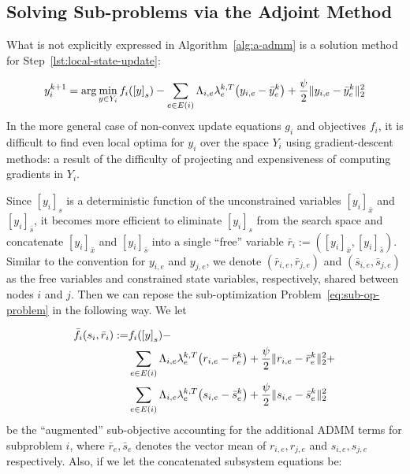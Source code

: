\subsection{Solving Sub-problems via the Adjoint Method} %
\label{sec:minimizing_sub_objectives_using_the_adjoint_method}

What is not explicitly expressed in Algorithm~\ref{alg:a-admm} is a solution method for Step~\ref{lst:local-state-update}:

\begin{align}
	\label{eq:sub-op-problem}
	y^{k+1}_i = \arg \min_{y \in Y_i}
        f_i\left(\left[y\right]_{s}\right) - 
        \sum_{e \in E\left(i\right)}
        \Lambda_{i,e} \lambda^{k,T}_{e} \left(y_{i,e} - \bar{y}^{k}_{e} \right) +
        \frac{\augterm}{2} \|y_{i,e} - \bar{y}^{k}_{e}\|_2^2
\end{align}
In the more general case of non-convex update equations $g_i$ and objectives $f_i$, it is difficult to find even local optima for $y_i$ over the space $Y_i$ using gradient-descent methods: a result of the difficulty of projecting and expensiveness of computing gradients in $Y_i$.

Since $\left[y_i\right]_{s}$ is a deterministic function of the unconstrained variables $\left[y_i\right]_{\bar{x}}$ and $\left[y_i\right]_{\bar{s}}$, it becomes more efficient to eliminate $\left[y_i\right]_{s}$ from the search space and concatenate $\left[y_i\right]_{\bar{x}}$ and $\left[y_i\right]_{\bar{s}}$ into a single ``free'' variable $\bar{r}_i := \left(\left[y_i\right]_{\bar{x}},\left[y_i\right]_{\bar{s}} \right)$. Similar to the convention for $y_{i,e}$ and $y_{j,e}$, we denote $\left(\bar{r}_{i,e}, \bar{r}_{j,e}\right)$ and $\left(\bar{s}_{i,e}, \bar{s}_{j,e}\right)$ as the free variables and constrained state variables, respectively, shared between nodes $i$ and $j$. Then we can repose the sub-optimization Problem~\eqref{eq:sub-op-problem} in the following way. We let

\begin{align*}
\bar{f_i}\left(s_i,\bar{r}_i\right) := & f_i\left(\left[y\right]_{s}\right) - \\
        & \sum_{e \in E\left(i\right)}
        \Lambda_{i,e} \lambda^{k,T}_{e} \left(r_{i,e} - \bar{r}^{k}_{e} \right) +
        \frac{\augterm}{2} \|r_{i,e} - \bar{r}^{k}_{e}\|_2^2 + \\
        & \sum_{e \in E\left(i\right)}
        \Lambda_{i,e} \lambda^{k,T}_{e} \left(s_{i,e} - \bar{s}^{k}_{e} \right) +
        \frac{\augterm}{2} \|s_{i,e} - \bar{s}^{k}_{e}\|_2^2        
\end{align*}
be the ``augmented'' sub-objective accounting for the additional ADMM terms for subproblem $i$, where $\bar{r}_e,\bar{s}_e$ denotes the vector mean of $r_{i,e},r_{j,e}$ and $s_{i,e},s_{j,e}$ respectively. Also, if we let the concatenated subsystem equations be:

